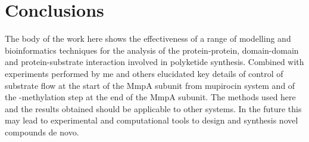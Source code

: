 %		
%	
%	 
	
\section{Conclusions}
\label{sec:conclusions}
The body of the work here shows the effectiveness of a range of modelling and bioinformatics techniques for the analysis of the protein-protein, domain-domain and protein-substrate interaction involved in polyketide synthesis. Combined with experiments performed by me and others elucidated key details of control of substrate flow at the start of the MmpA subunit from mupirocin system and of the \bet-methylation step at the end of the MmpA subunit. The methods used here and the results obtained should be applicable to other systems. In the future this may lead to experimental and computational tools to design and synthesis novel compounds de novo.

	
	
	